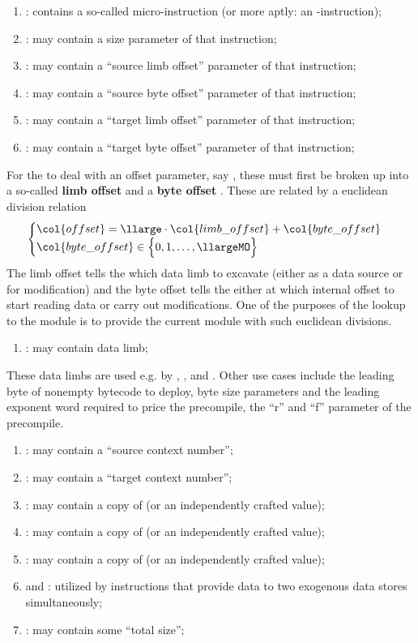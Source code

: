 \begin{enumerate}
	\item \microInst:
		contains a so-called micro-instruction (or more aptly: an \mmioMod{}-instruction);
	\item \microSize:
		may contain a size parameter of that instruction;
	\item \microSlo:
		may contain a ``source limb offset'' parameter of that instruction;
	\item \microSbo:
		may contain a ``source byte offset'' parameter of that instruction;
	\item \microTlo:
		may contain a ``target limb offset'' parameter of that instruction;
	\item \microTbo:
		may contain a ``target byte offset'' parameter of that instruction;
\end{enumerate}
For the \mmioMod{} to deal with an offset parameter, say , these must first be broken up into a so-called \textbf{limb offset}  and a \textbf{byte offset} .
These are related by a euclidean division relation
\[
	\begin{cases}
		\col{offset} = \llarge \cdot \col{limb\_offset} + \col{byte\_offset} \\
		\col{byte\_offset} \in \Big\{ 0, 1, \dots, \llargeMO \Big\} \\
	\end{cases}
\]
The limb offset tells the \mmioMod{} which data limb to excavate (either as a data source or for modification) and
the byte offset tells the \mmioMod{} either at which internal offset to start reading data or carry out modifications.
One of the purposes of the lookup to the \eucMod{} module is to provide the current module with such euclidean divisions.
\begin{enumerate}[resume]
	\item \microLimb{}:
		may contain data limb;
\end{enumerate}
These data limbs are used e.g. by
,
,
 and
.
Other use cases include
the leading byte of nonempty bytecode to deploy,
byte size parameters and the leading exponent word required to price the
\instModexp{} precompile,
the ``r'' and ``f'' parameter of the
\instBlake{} precompile.
\begin{enumerate}[resume]
	\item \microCns:
		may contain a ``source context number'';
	\item \microCnt:
		may contain a ``target context number'';
	\item \microSuccessBit:
		may contain a copy of \macroSuccessBit{} (or an independently crafted value);
	\item \microExoSum:
		may contain a copy of \macroExoSum{} (or an independently crafted value);
	\item \microPhase:
		may contain a copy of \macroPhase{} (or an independently crafted value);
	\item \microIdOne{} and \microIdTwo:
		utilized by \mmuMod{} instructions that provide data to two exogenous data stores simultaneously;
	\item \microTotalSize:
		may contain some ``total size'';
\end{enumerate}
